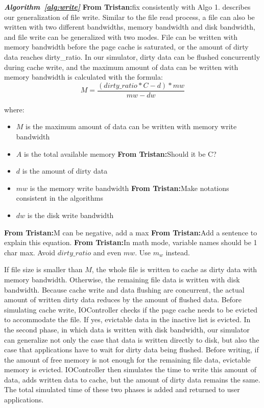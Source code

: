 \documentclass[conference]{IEEEtran}
\newcommand{\tristan}[1]{\color{orange}\textbf{From Tristan:}#1\color{black}}
\begin{document}
			\textbf{\textit{Algorithm~\ref{alg:write}}} \tristan{fix consistently with Algo 1.} describes our
			generalization of file write. Similar to the file read process,
			a file can also be written with two different bandwidths,
			memory bandwidth and disk bandwidth, and file write can be
			generalized with two modes. File can be written with memory
			bandwidth before the page cache is saturated, or the amount of
			dirty data reaches dirty\_ratio. In our simulator, dirty data
			can be flushed concurrently during cache write, and the maximum
			amount of data can be written with memory bandwidth is
			calculated with the formula:
			\begin{equation}
				M = \frac{(dirty\_ratio*C - d)*mw}{mw - dw}
			\end{equation}			 			

			where:
			\begin{itemize}
				\item $M$ is the maximum amount of data can be written with memory write bandwidth
				\item $A$ is the total available memory \tristan{Should it be C?}
				\item $d$ is the amount of dirty data
				\item $mw$ is the memory write bandwidth \tristan{Make notations consistent in the algorithms}
				\item $dw$ is the disk write bandwidth			
			\end{itemize}
			\tristan{M can be negative, add a max} \tristan{Add a sentence to explain this equation.	}
			\tristan{In math mode, variable names should be 1 char max. Avoid $dirty\_ratio$ and even $mw$. Use $m_w$ instead.}

			If file size is smaller than $M$, the whole file is written to cache as dirty data with memory bandwidth. Otherwise, the remaining file data is written with disk bandwidth. Because cache write and data flushing are concurrent, the actual amount of written dirty data reduces by the amount of flushed data. Before simulating cache write, IOController checks if the page cache needs to be evicted to accommodate the file. If yes, evictable data in the inactive list is evicted. In the second phase, in which data is written with disk bandwidth, our simulator can generalize not only the case that data is written directly to disk, but also the case that applications have to wait for dirty data being flushed. Before writing, if the amount of free memory is not enough for the remaining file data, evictable memory is evicted. IOController then simulates the time to write this amount of data, adds written data to cache, but the amount of dirty data remains the same. The total simulated time of these two phases is added and returned to user applications.		
			
\end{document}
